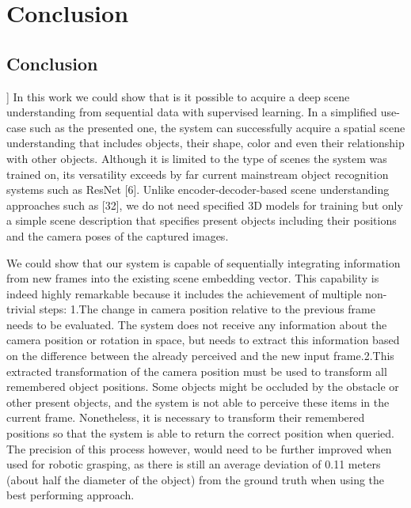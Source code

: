 
\chapter{Conclusion}\label{chap:conclusion}
\section{Conclusion}]
In this work we could show that is it possible to acquire a deep scene understanding from sequential
data with supervised learning. In a simpliﬁed use-case such as the presented one, the system can
successfully acquire a spatial scene understanding that includes objects, their shape, color and even
their relationship with other objects. Although it is limited to the type of scenes the system was trained
on, its versatility exceeds by far current mainstream object recognition systems such as ResNet [6].
Unlike encoder-decoder-based scene understanding approaches such as [32], we do not need speciﬁed
3D models for training but only a simple scene description that speciﬁes present objects including their
positions and the camera poses of the captured images. 

We could show that our system is capable of
sequentially integrating information from new frames into the existing scene embedding vector. This
capability is indeed highly remarkable because it includes the achievement of multiple non-trivial steps:
1.The change in camera position relative to the previous frame needs to be evaluated. The system does
not receive any information about the camera position or rotation in space, but needs to extract this
information based on the diﬀerence between the already perceived and the new input frame.2.This
extracted transformation of the camera position must be used to transform all remembered object
positions. Some objects might be occluded by the obstacle or other present objects, and the system is
not able to perceive these items in the current frame. Nonetheless, it is necessary to transform their
remembered positions so that the system is able to return the correct position when queried. The
precision of this process however, would need to be further improved when used for robotic grasping,
as there is still an average deviation of 0.11 meters (about half the diameter of the object) from the
ground truth when using the best performing approach.

